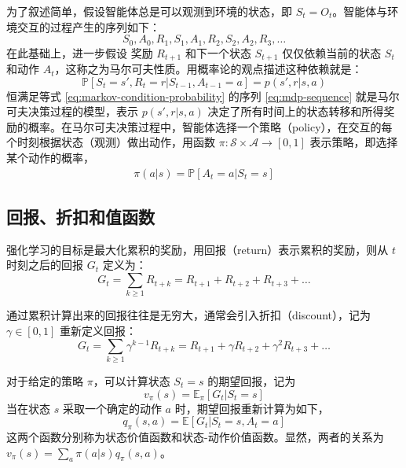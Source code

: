 为了叙述简单，假设智能体总是可以观测到环境的状态，即 $S_t = O_t$。智能体与环境交互的过程产生的序列如下：
\begin{equation}
    S_0, A_0, R_1, S_1, A_1, R_2, S_2, A_2, R_3,\dots
    \label{eq:mdp-sequence}
\end{equation}
在此基础上，进一步假设 奖励 $R_{t+1}$ 和下一个状态 $S_{t+1}$ 仅仅依赖当前的状态 $S_t$ 和动作 $A_t$，这称之为马尔可夫性质。用概率论的观点描述这种依赖就是：
\begin{equation}
    \mathbb{P}[S_t = s', R_t = r| S_{t-1}, A_{t-1} = a] = p(s', r | s, a)
    \label{eq:markov-condition-probability}
\end{equation}
恒满足等式 \ref{eq:markov-condition-probability} 的序列 \ref{eq:mdp-sequence} 就是马尔可夫决策过程的模型，表示 $p(s', r | s, a)$ 决定了所有时间上的状态转移和所得奖励的概率。在马尔可夫决策过程中，智能体选择一个策略（policy），在交互的每个时刻根据状态（观测）做出动作，用函数 $\pi : \mathcal{S} \times \mathcal{A} \rightarrow [0, 1]$ 表示策略，即选择某个动作的概率，
\begin{equation}
        \begin{split}
            \pi(a|s) = \mathbb{P} [A_t = a | S_t = s]
        \end{split}
\end{equation}

\subsection{回报、折扣和值函数}
强化学习的目标是最大化累积的奖励，用回报（return）表示累积的奖励，则从 $t$ 时刻之后的回报 $G_t$ 定义为：
\begin{equation}
    G_t = \sum_{k \geq 1} R_{t+k} = R_{t+1} + R_{t+2} + R_{t+3} + \dots
\end{equation}

通过累积计算出来的回报往往是无穷大，通常会引入折扣（discount），记为$\gamma \in [0,1]$ 重新定义回报：
\begin{equation}
    G_t = \sum_{k \geq 1} \gamma^{k-1} R_{t+k} = R_{t+1} + \gamma R_{t+2} + \gamma^2 R_{t+3} + \dots
    \label{eq:return}
\end{equation}

对于给定的策略 $\pi$，可以计算状态 $S_t = s$ 的期望回报，记为
\begin{equation}
    v_\pi (s) = \mathbb{E}_\pi [G_t | S_t = s]
    \label{eq:state-value-function}
\end{equation}
当在状态 $s$ 采取一个确定的动作 $a$ 时，期望回报重新计算为如下，
\begin{equation}
    q_\pi(s, a) = \mathbb{E} [G_t | S_t = s, A_t = a]
    \label{eq:action-value-function}
\end{equation}
这两个函数分别称为状态价值函数和状态-动作价值函数。显然，两者的关系为 $ v_\pi(s) = \sum_{a} \pi(a|s) q_{\pi} (s, a)$。

